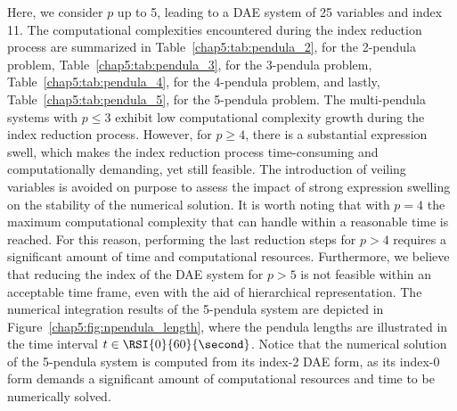 Here, we consider $p$ up to 5, leading to a \ac{DAE} system of 25 variables and index 11. The computational complexities encountered during the index reduction process are summarized in Table~\ref{chap5:tab:pendula_2}, for the 2-pendula problem, Table~\ref{chap5:tab:pendula_3}, for the 3-pendula problem, Table~\ref{chap5:tab:pendula_4}, for the 4-pendula problem, and lastly, Table~\ref{chap5:tab:pendula_5}, for the 5-pendula problem. The multi-pendula systems with $p \leq 3$ exhibit low computational complexity growth during the index reduction process. However, for $p \geq 4$, there is a substantial expression swell, which makes the index reduction process time-consuming and computationally demanding, yet still feasible. The introduction of veiling variables is avoided on purpose to assess the impact of strong expression swelling on the stability of the numerical solution. It is worth noting that with $p = 4$ the maximum computational complexity that \Maple{} can handle within a reasonable time is reached. For this reason, performing the last reduction steps for $p > 4$ requires a significant amount of time and computational resources. Furthermore, we believe that reducing the index of the \ac{DAE} system for $p > 5$ is not feasible within an acceptable time frame, even with the aid of hierarchical representation. The numerical integration results of the 5-pendula system are depicted in Figure~\ref{chap5:fig:npendula_length}, where the pendula lengths are illustrated in the time interval $t \in \RSI{0}{60}{\second}$. Notice that the numerical solution of the 5-pendula system is computed from its index-2 \ac{DAE} form, as its index-0 form demands a significant amount of computational resources and time to be numerically solved.

